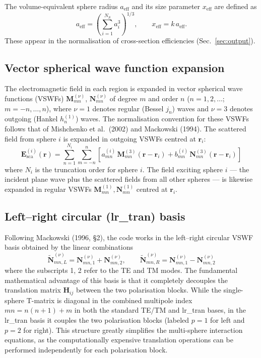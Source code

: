 \documentclass[11pt,a4paper]{article}
\begin{document}
The volume-equivalent sphere radius $a_\mathrm{eff}$ and its size parameter $x_\mathrm{eff}$ are defined as
\begin{equation}
  a_\mathrm{eff} = \left(\sum_{i=1}^{N_S} a_i^3\right)^{\!1/3}, \qquad
  x_\mathrm{eff} = k\,a_\mathrm{eff}.
  \label{eq:a-eff}
\end{equation}
These appear in the normalisation of cross-section efficiencies (Sec.~\ref{sec:output}).

\subsection{Vector spherical wave function expansion}

The electromagnetic field in each region is expanded in vector spherical wave functions (VSWFs) $\bm{M}_{mn}^{(\nu)}$, $\bm{N}_{mn}^{(\nu)}$ of degree $m$ and order $n$ ($n = 1, 2, \dots$; $m = -n, \dots, n$), where $\nu = 1$ denotes regular (Bessel $j_n$) waves and $\nu = 3$ denotes outgoing (Hankel $h_n^{(1)}$) waves.
The normalisation convention for these VSWFs follows that of Mishchenko et al.\ (2002) and Mackowski (1994).
The scattered field from sphere $i$ is expanded in outgoing VSWFs centred at $\bm{r}_i$:
\begin{equation}
  \bm{E}_\mathrm{sca}^{(i)}(\bm{r}) = \sum_{n=1}^{N_i} \sum_{m=-n}^{n}
  \left[ a_{mn}^{(i)}\,\bm{M}_{mn}^{(3)}(\bm{r} - \bm{r}_i)
       + b_{mn}^{(i)}\,\bm{N}_{mn}^{(3)}(\bm{r} - \bm{r}_i) \right]
  \label{eq:sca-expansion}
\end{equation}
where $N_i$ is the truncation order for sphere $i$.
The field exciting sphere $i$ --- the incident plane wave plus the scattered fields from all other spheres --- is likewise expanded in regular VSWFs $\bm{M}_{mn}^{(1)}, \bm{N}_{mn}^{(1)}$ centred at $\bm{r}_i$.

\subsection{Left--right circular (lr\_tran) basis}

Following Mackowski (1996, \S 2), the code works in the left--right circular VSWF basis obtained by the linear combinations
\begin{equation}
  \tilde{\bm{N}}_{mn,L}^{(\nu)} = \bm{N}_{mn,1}^{(\nu)} + \bm{N}_{mn,2}^{(\nu)}, \qquad
  \tilde{\bm{N}}_{mn,R}^{(\nu)} = \bm{N}_{mn,1}^{(\nu)} - \bm{N}_{mn,2}^{(\nu)}
  \label{eq:lr-basis}
\end{equation}
where the subscripts 1, 2 refer to the TE and TM modes.
The fundamental mathematical advantage of this basis is that it completely decouples the translation matrix $\mathbf{H}_{ij}$ between the two polarisation blocks.
While the single-sphere T-matrix is diagonal in the combined multipole index $mn = n(n+1) + m$ in both the standard TE/TM and lr\_tran bases, in the lr\_tran basis it couples the two polarisation blocks (labeled $p = 1$ for left and $p = 2$ for right).
This structure greatly simplifies the multi-sphere interaction equations, as the computationally expensive translation operations can be performed independently for each polarisation block.
\end{document}

